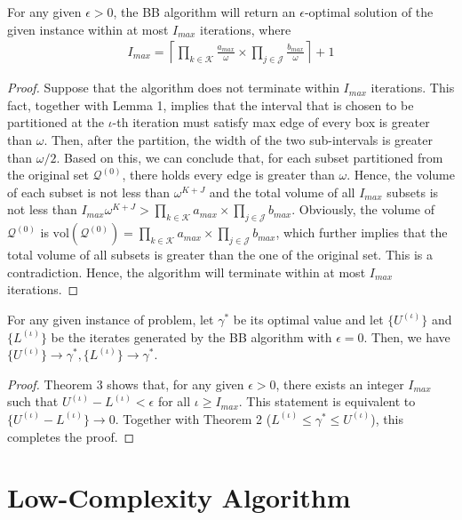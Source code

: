 \documentclass[runningheads]{llncs}
\begin{document}
\begin{theorem}
For any given $\epsilon > 0$, the BB algorithm will return an $\epsilon$-optimal solution of the given instance within at most $I_{max}$
iterations, where
\begin{align}
    I_{max} =  \left\lceil \prod_{k \in \mathcal{K}} \frac{a_{max} }{\omega} \times \prod_{j\in\mathcal{J}} \frac{b_{max} }{\omega} \right\rceil + 1
\end{align}
\end{theorem}
\begin{proof}
Suppose that the algorithm does not terminate within $I_{max}$ iterations. This fact, together with Lemma 1, implies that the interval that is chosen to be partitioned at the $\iota$-th iteration must satisfy max edge of every box is greater than $\omega$. Then, after the partition, the width of the two sub-intervals is greater than $\omega/2$. Based on this, we can conclude that, for each subset partitioned from the
original set $\mathcal{Q}^{(0)}$, there holds every edge is greater than $\omega$. Hence, the volume of each subset is not less than $\omega^{K+J}$ and the total volume of all $I_{max}$ subsets is not less than $I_{max}\omega^{K+J} > \prod_{k \in \mathcal{K}} {a_{max} } \times \prod_{j\in\mathcal{J}} {b_{max} }$.
Obviously, the volume of $\mathcal{Q}^{(0)}$ is $\mathrm{vol}(\mathcal{Q}^{(0)})  =\prod_{k \in \mathcal{K}} {a_{max} } \times \prod_{j\in\mathcal{J}} {b_{max} }$, which further implies that the total volume of all subsets is greater than the one of the original set. This is a contradiction. Hence, the algorithm will terminate within at most $I_{max}$ iterations.
\end{proof}

\begin{corollary}
For any given instance of problem, let $\gamma^*$ be its optimal value and let $\{U^{(\iota)}\}$ and $\{L^{(\iota)}\}$ be the iterates generated by the BB algorithm with $\epsilon = 0$. Then, we have $\{U^{(\iota)}\} \to \gamma^*, \{L^{(\iota)}\} \to \gamma^*$.
\end{corollary}
\begin{proof}
Theorem 3 shows that, for any given $\epsilon > 0$, there exists an integer $I_{max}$ such that $U^{(\iota)} - L^{(\iota)} < \epsilon $ for all $\iota \ge I_{max}$. This statement is equivalent to $\{U^{(\iota)} - L^{(\iota)}\} \to 0$. Together with Theorem 2 ($L^{(\iota)} \le \gamma^* \le U^{(\iota)}$), this completes the proof.
\end{proof}
\section{Low-Complexity Algorithm}
\end{document}
